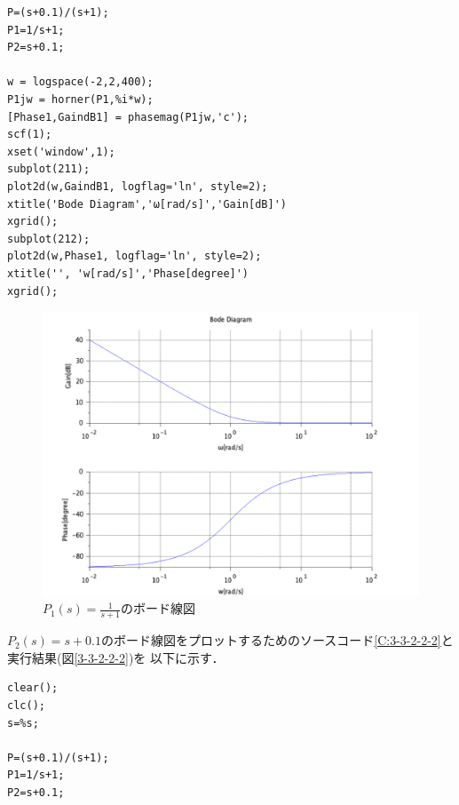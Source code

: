 \documentclass[a4paper,11pt]{jsarticle}
\begin{document}
\begin{enumerate}
\begin{lstlisting}[caption=図\ref{3-3-2-2-1}をプロットするコード, label=C:3-3-2-2-1]
P=(s+0.1)/(s+1);
P1=1/s+1;
P2=s+0.1;

w = logspace(-2,2,400);
P1jw = horner(P1,%i*w);
[Phase1,GaindB1] = phasemag(P1jw,'c');
scf(1);
xset('window',1);
subplot(211);
plot2d(w,GaindB1, logflag='ln', style=2);
xtitle('Bode Diagram','ω[rad/s]','Gain[dB]')
xgrid();
subplot(212);
plot2d(w,Phase1, logflag='ln', style=2);
xtitle('', 'w[rad/s]','Phase[degree]')
xgrid();
      \end{lstlisting}
      \begin{figure}[H]
        \centering
        \includegraphics[width=0.8\linewidth]{picture/kadai7-2.png}
        \caption{$P_1(s)=\frac{1}{s+1}$のボード線図}
        \label{3-3-2-2-1}
      \end{figure}
      $P_2(s)=s+0.1$のボード線図をプロットするためのソースコード\ref{C:3-3-2-2-2}と実行結果(図\ref{3-3-2-2-2})を
      以下に示す．
      \begin{lstlisting}[caption=図\ref{3-3-2-2-2}をプロットするコード, label=C:3-3-2-2-2]
clear();
clc();
s=%s;

P=(s+0.1)/(s+1);
P1=1/s+1;
P2=s+0.1;


\end{lstlisting}
\end{enumerate}
\end{document}
